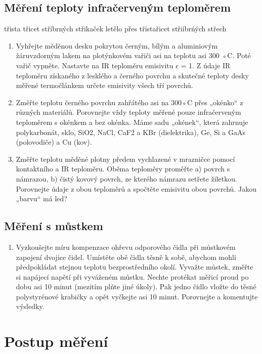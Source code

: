 \documentclass[a4paper,11pt]{article}
\begin{document}
\subsection{Měření teploty infračerveným teploměrem}

třista třicet stříbrných střikaček letělo přes třistařicet střiíbrńých střech

\begin{enumerate}
\item Vyhřejte měděnou desku pokrytou černým, bílým a aluminiovým žáruvzdorným lakem na
plotýnkovém vařiči asi na teplotu asi 300 ◦C. Poté vařič vypněte. Nastavte na IR teploměru
emisivitu $\epsilon$ = 1. Z údaje IR teploměru získaného z lesklého a černého povrchu a skutečné
teploty desky měřené termočlánkem určete emisivity všech tří povrchů. 
\item Změřte teplotu černého povrchu zahřátého asi na 300◦C přes „okénko“ z různých materiálů. Porovnejte vždy teploty měřené pouze
infračerveným teploměrem s okénkem a bez okénka. Máme sadu „okének“, která zahrnuje
polykarbonát, sklo, SiO2, NaCl, CaF2 a KBr (dielektrika), Ge, Si a GaAs (polovodiče) a
Cu (kov). 
\item Změřte teplotu měděné plotny předem vychlazené v mrazničce pomocí kontaktního a IR
teploměru. Oběma teploměry proměřte a) povrch s námrazou, b) čistý kovový povrch, ze
kterého námrazu setřete žiletkou. Porovnejte údaje z obou teploměrů a spočtěte emisivitu
obou povrchů. Jakou „barvu“ má led?

\end{enumerate}

\subsection{Měření s můstkem}

\begin{enumerate}
  \item Vyzkoušejte míru kompenzace ohřevu odporového čidla při můstkovém zapojení dvojice
čidel. Umístěte obě čidla těsně k sobě, abychom mohli předpokládat stejnou teplotu bezprostředního okolí. Vyvažte
můstek, změřte si napájecí napětí při vyváženém můstku. Nechte protékat měřicí proud po
dobu asi 10 minut (mezitím plňte jiné úkoly). Pak jedno čidlo vložte do těsné polystyrénové
krabičky a opět vyčkejte asi 10 minut. Porovnejte a komentujte výsledky.
 
\end{enumerate}

\section{Postup měření}
\end{document}
